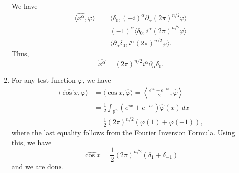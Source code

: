 \documentclass[12pt]{amsart}
\newcommand{\R}{\mathbb{R}}
\newcommand{\wh}[1]{\widehat{#1}}
\begin{document}
\begin{enumerate}[label=(\alph*)]
    We have 
    \begin{align*}
        \langle \wh{x^\alpha}, \varphi\rangle &= \langle\delta_0, (-i)^\alpha\partial_\alpha(2\pi)^{n/2}\varphi\rangle\\
        &= (-1)^\alpha\langle\delta_0, i^\alpha(2\pi)^{n/2}\varphi\rangle\\
        &= \langle\partial_\alpha\delta_0, i^\alpha(2\pi)^{n/2}\varphi\rangle.
    \end{align*}
    Thus, 
    \begin{equation*}
        \wh{x^\alpha} = (2\pi)^{n/2}i^\alpha\partial_\alpha\delta_0.
    \end{equation*}

    \item For any test function $\varphi$, we have 
    \begin{align*}
        \langle\wh{\cos x}, \varphi\rangle &= \langle \cos x,\wh\varphi\rangle = \left\langle\frac{e^{ix} + e^{-ix}}{2},\wh\varphi\right\rangle\\
        &= \frac{1}{2}\int_{\R^n}(e^{ix} + e^{-ix})\wh\varphi(x)~dx\\
        &= \frac{1}{2}(2\pi)^{n/2}(\varphi(1) + \varphi(-1)),
    \end{align*}
    where the last equality follows from the Fourier Inversion Formula. Using this, we have 
    \begin{equation*}
        \wh{\cos x} = \frac{1}{2}(2\pi)^{n/2}(\delta_1 + \delta_{-1})
    \end{equation*}
    and we are done.
\end{enumerate}
\end{document}
